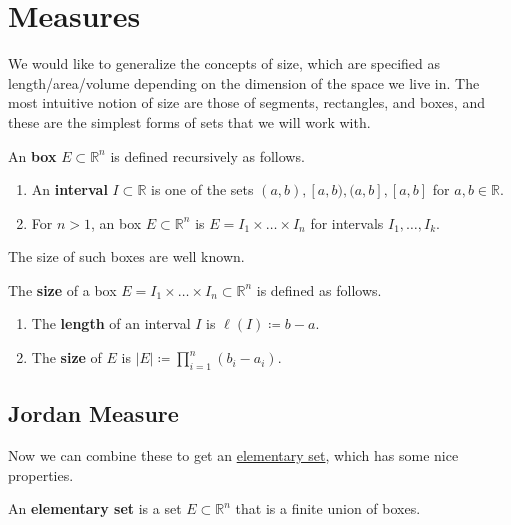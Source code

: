 \section{Measures}

  We would like to generalize the concepts of size, which are specified as length/area/volume depending on the dimension of the space we live in. The most intuitive notion of size are those of segments, rectangles, and boxes, and these are the simplest forms of sets that we will work with. 

  \begin{definition}[Box]
    \label{def:box}
 
    An \textbf{box} $E \subset \mathbb{R}^n$ is defined recursively as follows. 
    \begin{enumerate}
      \item An \textbf{interval} $I \subset \mathbb{R}$ is one of the sets $(a, b), [a, b), (a, b], [a, b]$ for $a, b \in \mathbb{R}$. 
      \item For $n > 1$, an box $E \subset \mathbb{R}^n$ is $E = I_1 \times \ldots \times I_n$ for intervals $I_1, \ldots, I_k$. 
    \end{enumerate}
  \end{definition} 

	The size of such boxes are well known. 

  \begin{definition}
    \label{def:size-of-a-box}
    The \textbf{size} of a box $E = I_1 \times \ldots \times I_n \subset \mathbb{R}^n$ is defined as follows. 
    \begin{enumerate}
      \item The \textbf{length} of an interval $I$ is $\ell(I) \coloneqq b - a$. 
      \item The \textbf{size} of $E$ is $|E| \coloneqq \prod_{i=1}^n (b_i - a_i)$. 
    \end{enumerate}
  \end{definition}

\subsection{Jordan Measure}

  Now we can combine these to get an \hyperref[def:elementary-set]{elementary set}, which has some nice properties. 

  \begin{definition}
    \label{def:elementary-set}
    An \textbf{elementary set} is a set $E \subset \mathbb{R}^n$ that is a finite union of boxes. 
  \end{definition}

